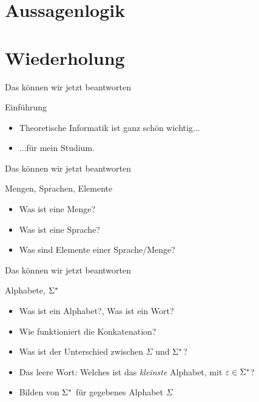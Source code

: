 \section{Aussagenlogik}



\section{Wiederholung}
\begin{frame}[fragile]{Das können wir jetzt beantworten}
    \begin{alertblock}{Einführung}
    \begin{itemize}
        \item Theoretische Informatik ist ganz schön wichtig...
        \item ...für mein Studium.
    \end{itemize}
    \end{alertblock}
\end{frame}

\begin{frame}[fragile]{Das können wir jetzt beantworten}
    \begin{alertblock}{Mengen, Sprachen, Elemente}
    \begin{itemize}
        \item Was ist eine Menge?
        \item Was ist eine Sprache?
        \item Was sind Elemente einer Sprache/Menge?
    \end{itemize}
    \end{alertblock}
\end{frame}

\begin{frame}[fragile]{Das können wir jetzt beantworten}
    \begin{alertblock}{Alphabete, $\Sigma^{*}$}
    \begin{itemize}
        \item Was ist ein Alphabet?, Was ist ein Wort?
        \item Wie funktioniert die Konkatenation?
        \item Was ist der Unterschied zwischen $\Sigma$ und $\Sigma^{*}$?
        \item Das leere Wort: Welches ist das \textit{kleinste} Alphabet, mit $\varepsilon \in \Sigma^{*}$?
        \item Bilden von $\Sigma^{*}$ für gegebenes Alphabet $\Sigma$
    \end{itemize}
    \end{alertblock}
\end{frame}

